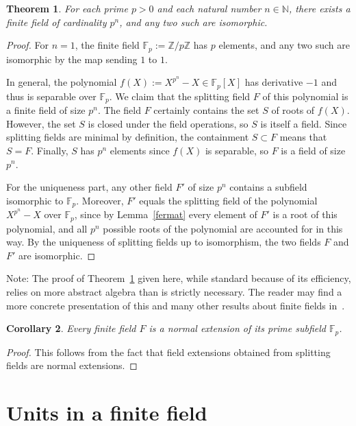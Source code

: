 \documentclass[12pt]{article}
\newcommand{\Z}{\mathbb{Z}}
\newcommand{\N}{\mathbb{N}}
\newcommand{\F}{\mathbb{F}}
\newtheorem{theorem}{Theorem}[section]
\newtheorem{corollary}[theorem]{Corollary}
\theoremstyle{definition}
\begin{document}
\begin{theorem}\label{existence}
For each prime $p > 0$ and each natural number $n \in \N$, there
exists a finite field of cardinality $p^n$, and any two such are
isomorphic.
\end{theorem}
\begin{proof}
For $n=1$, the finite field $\F_p := \Z/p\Z$ has $p$ elements, and any
two such are isomorphic by the map sending $1$ to $1$.

In general, the polynomial $f(X) := X^{p^n} - X \in \F_p[X]$ has
derivative $-1$ and thus is separable over $\F_p$. We claim that the
splitting field $F$ of this polynomial is a finite field of size
$p^n$. The field $F$ certainly contains the set $S$ of roots of
$f(X)$. However, the set $S$ is closed under the field operations, so
$S$ is itself a field. Since splitting fields are minimal by
definition, the containment $S \subset F$ means that $S = F$. Finally,
$S$ has $p^n$ elements since $f(X)$ is separable, so $F$ is a field of
size $p^n$.

For the uniqueness part, any other field $F'$ of size $p^n$ contains a
subfield isomorphic to $\F_p$. Moreover, $F'$ equals the splitting field of
the polynomial $X^{p^n} - X$ over $\F_p$, since by Lemma~\ref{fermat} every element of $F'$ is a root of this polynomial, and all $p^n$ possible roots of the polynomial are accounted for in this way. By the uniqueness of
splitting fields up to isomorphism, the two fields $F$ and $F'$ are
isomorphic.
\end{proof}

Note: The proof of Theorem~\ref{existence} given here, while standard
because of its efficiency, relies on more abstract algebra than is
strictly necessary. The reader may find a more concrete presentation
of this and many other results about finite fields
in~\cite[Ch. 7]{ir}.

\begin{corollary}\label{normal}
Every finite field $F$ is a normal extension of its prime subfield
$\F_p$.
\end{corollary}
\begin{proof}
This follows from the fact that field extensions obtained from
splitting fields are normal extensions.
\end{proof}

\section{Units in a finite field}
\end{document}
